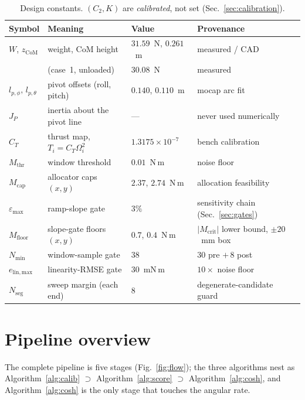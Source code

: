\documentclass[10pt]{article}
\begin{document}
\begin{table}[h]\centering\small
\begin{tabular}{llll}
\toprule
Symbol & Meaning & Value & Provenance \\
\midrule
$W$, $z_{\mathrm{CoM}}$ & weight, CoM height & $31.59$~N, $0.261$~m & measured / CAD \\
& \quad (case~1, unloaded) & $30.08$~N & measured \\
$l_{p,\phi},\,l_{p,\theta}$ & pivot offsets (roll, pitch) & $0.140$, $0.110$~m & mocap arc fit \\
$J_P$ & inertia about the pivot line & — & never used numerically \\
$C_T$ & thrust map, $T_i = C_T\Omega_i^2$ & $1.3175\times10^{-7}$ & bench calibration \\
$M_{\mathrm{thr}}$ & window threshold & $0.01$~N\,m & noise floor \\
$M_{\mathrm{cap}}$ & allocator caps $(x,y)$ & $2.37$, $2.74$~N\,m & allocation feasibility \\
$\varepsilon_{\max}$ & ramp-slope gate & $3\%$ & sensitivity chain (Sec.~\ref{sec:gates}) \\
$M_{\mathrm{floor}}$ & slope-gate floors $(x,y)$ & $0.7$, $0.4$~N\,m & $|M_{\mathrm{crit}}|$ lower bound, $\pm20$~mm box \\
$N_{\min}$ & window-sample gate & $38$ & $30$ pre $+\,8$ post \\
$e_{\mathrm{lin,max}}$ & linearity-RMSE gate & $30$~mN\,m & $10\times$ noise floor \\
$N_{\mathrm{seg}}$ & sweep margin (each end) & $8$ & degenerate-candidate guard \\
\bottomrule
\end{tabular}
\caption{Design constants. $(C_2, K)$ are \emph{calibrated}, not set
(Sec.~\ref{sec:calibration}).}
\end{table}

\section{Pipeline overview}
\label{sec:overview}

The complete pipeline is five stages (Fig.~\ref{fig:flow}); the three
algorithms nest as Algorithm~\ref{alg:calib} $\supset$
Algorithm~\ref{alg:score} $\supset$ Algorithm~\ref{alg:cosh}, and
Algorithm~\ref{alg:cosh} is the only stage that touches the angular
rate.
\end{document}
